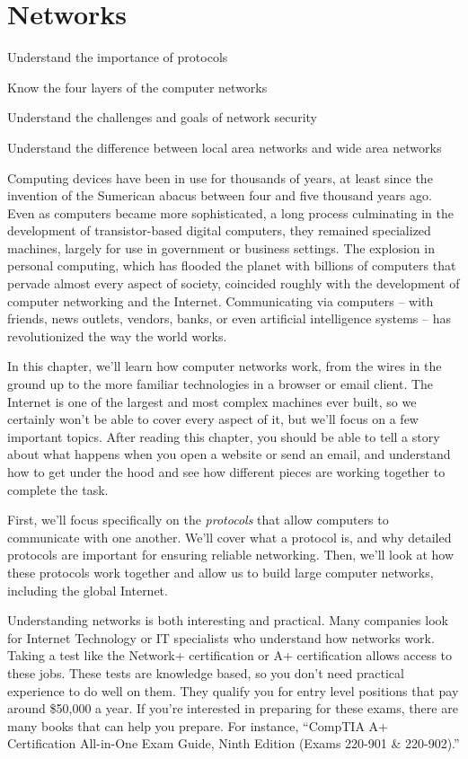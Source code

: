 \chapter{Networks}

\begin{goals}
\item Understand the importance of protocols
\item Know the four layers of the computer networks
\item Understand the challenges and goals of network security
\item Understand the difference between local area networks and wide area networks
\end{goals}

Computing devices have been in use for thousands of years, at least since the invention of the Sumerican abacus between four and five thousand years ago. Even as computers became more sophisticated, a long process culminating in the development of transistor-based digital computers, they remained specialized machines, largely for use in government or business settings. The explosion in personal computing, which has flooded the planet with billions of computers that pervade almost every aspect of society, coincided roughly with the development of computer networking and the Internet. Communicating via computers -- with friends, news outlets, vendors, banks, or even artificial intelligence systems -- has revolutionized the way the world works.

In this chapter, we'll learn how computer networks work, from the wires in the ground up to the more familiar technologies in a browser or email client. The Internet is one of the largest and most complex machines ever built, so we certainly won't be able to cover every aspect of it, but we'll focus on a few important topics. After reading this chapter, you should be able to tell a story about what happens when you open a website or send an email, and understand how to get under the hood and see how different pieces are working together to complete the task.

First, we'll focus specifically on the \emph{protocols} that allow computers to communicate with one another. We'll cover what a protocol is, and why detailed protocols are important for ensuring reliable networking. Then, we'll look at how these protocols work together and allow us to build large computer networks, including the global Internet.

Understanding networks is both interesting and practical. Many companies look for Internet Technology or IT specialists who understand how networks work. Taking a test like the Network+ certification or A+ certification allows access to these jobs. These tests are knowledge based, so you don’t need practical experience to do well on them. They qualify you for entry level positions that pay around \$50,000 a year. If you're interested in preparing for these exams, there are many books that can help you prepare. For instance, ``CompTIA A+ Certification All-in-One Exam Guide, Ninth Edition (Exams 220-901 \& 220-902).''

